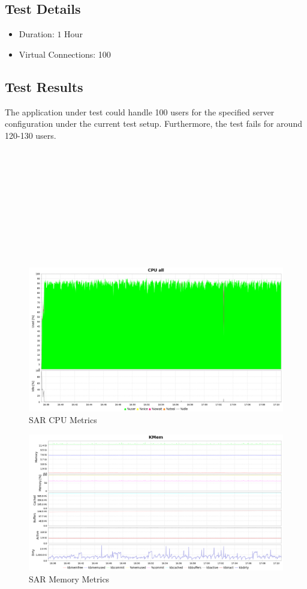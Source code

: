 \documentclass[12pt]{report}
\begin{document}
\subsection{Test Details}
\begin{itemize}
	\item Duration: $1$ Hour
	\item Virtual Connections: 100
\end{itemize}

\subsection{Test Results}
The application under test could handle 100 users for the specified server configuration under the current test setup. Furthermore, the test fails for around 120-130 users.
\\\\\\\\\\\\\\\\\\\\\\
\begin{figure}[h!]
	\centering
	\includegraphics[width=\textwidth,height=\textheight,keepaspectratio]{intro/cpu_mridul.png}
	\caption{SAR CPU Metrics}
\end{figure}
\begin{figure}[h!]
	\centering
	\includegraphics[width=\textwidth,height=\textheight,keepaspectratio]{intro/mem_mridul.png}
	\caption{SAR Memory Metrics}
\end{figure}
\end{document}
